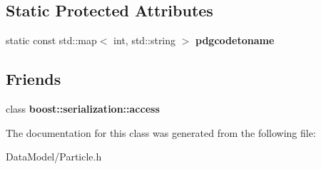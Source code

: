 \subsection*{Static Protected Attributes}
\begin{DoxyCompactItemize}
\item 
\hypertarget{classParticle_a545fefbf228c9460be39679d129dd90e}{
static const std::map$<$ int, std::string $>$ {\bfseries pdgcodetoname}}
\label{classParticle_a545fefbf228c9460be39679d129dd90e}

\end{DoxyCompactItemize}
\subsection*{Friends}
\begin{DoxyCompactItemize}
\item 
\hypertarget{classParticle_ac98d07dd8f7b70e16ccb9a01abf56b9c}{
class {\bfseries boost::serialization::access}}
\label{classParticle_ac98d07dd8f7b70e16ccb9a01abf56b9c}

\end{DoxyCompactItemize}


The documentation for this class was generated from the following file:\begin{DoxyCompactItemize}
\item 
DataModel/Particle.h\end{DoxyCompactItemize}

